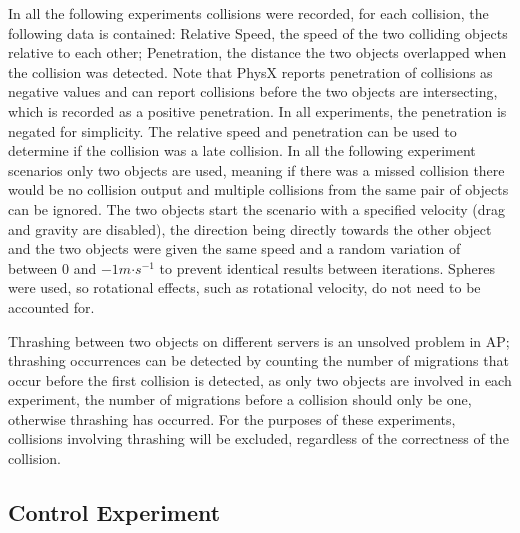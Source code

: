 

In all the following experiments collisions were recorded, for each collision, the following data is contained: Relative Speed, the speed of the two colliding objects relative to each other; Penetration, the distance the two objects overlapped when the collision was detected. Note that PhysX reports penetration of collisions as negative values and can report collisions before the two objects are intersecting, which is recorded as a positive penetration. In all experiments, the penetration is negated for simplicity. The relative speed and penetration can be used to determine if the collision was a late collision. In all the following experiment scenarios only two objects are used, meaning if there was a missed collision there would be no collision output and multiple collisions from the same pair of objects can be ignored. The two objects start the scenario with a specified velocity (drag and gravity are disabled), the direction being directly towards the other object and the two objects were given the same speed and a random variation of between $0$ and $-1m\mathord{\cdot}s^{-1}$ to prevent identical results between iterations. Spheres were used, so rotational effects, such as rotational velocity, do not need to be accounted for. 

Thrashing between two objects on different servers is an unsolved problem in AP; thrashing occurrences can be detected by counting the number of migrations that occur before the first collision is detected, as only two objects are involved in each experiment, the number of migrations before a collision should only be one, otherwise thrashing has occurred. For the purposes of these experiments, collisions involving thrashing will be excluded, regardless of the correctness of the collision.


\subsection{Control Experiment}


